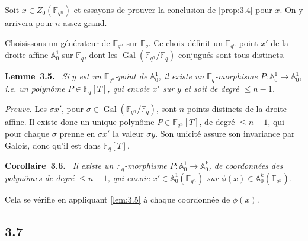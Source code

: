 \documentclass[11pt,a4paper]{article}
\makeatletter
\theoremstyle{plain}
\theoremstyle{definition}
\newenvironment{manualblock}[4]{%
  \par\medskip\noindent\textbf{#1~#2#3.}\def\@currentlabel{#2}\label{#4}\itshape\ }{\par\normalfont\medskip}
\DeclareMathOperator{\Gal}{Gal}
\makeatother
\begin{document}
Soit $x \in Z_0(\mathbb{F}_{q^n})$ et essayons de prouver la conclusion de \ref{prop:3.4} pour $x$. On y arrivera pour $n$ assez grand.

Choisissons un g\'en\'erateur de $\mathbb{F}_{q^n}$ sur $\mathbb{F}_q$. Ce choix d\'efinit un $\mathbb{F}_{q^n}$-point $x'$ de la droite affine $\mathbb{A}_0^1$ sur $\mathbb{F}_q$, dont les $\Gal(\mathbb{F}_{q^n}/\mathbb{F}_q)$-conjugu\'es sont tous distincts.

\begin{manualblock}{Lemme}{3.5}{}{lem:3.5}
Si $y$ est un $\mathbb{F}_{q^n}$-point de $\mathbb{A}_0^1$, il existe un $\mathbb{F}_q$-morphisme $P: \mathbb{A}_0^1 \to \mathbb{A}_0^1$, i.e. un polyn\^ome $P \in \mathbb{F}_q[T]$, qui envoie $x'$ sur $y$ et soit de degr\'e $\leq n-1$.
\end{manualblock}

\noindent\textit{Preuve.} Les $\sigma x'$, pour $\sigma \in \Gal(\mathbb{F}_{q^n}/\mathbb{F}_q)$, sont $n$ points distincts de la droite affine. Il existe donc un unique polyn\^ome $P \in \mathbb{F}_{q^n}[T]$, de degr\'e $\leq n-1$, qui pour chaque $\sigma$ prenne en $\sigma x'$ la valeur $\sigma y$. Son unicit\'e assure son invariance par Galois, donc qu'il est dans $\mathbb{F}_q[T]$.

\begin{manualblock}{Corollaire}{3.6}{}{cor:3.6}
Il existe un $\mathbb{F}_q$-morphisme $P: \mathbb{A}_0^1 \to \mathbb{A}_0^k$, de coordonn\'ees des polyn\^omes de degr\'e $\leq n-1$, qui envoie $x' \in \mathbb{A}_0^1(\mathbb{F}_{q^n})$ sur $\phi(x) \in \mathbb{A}_0^k(\mathbb{F}_{q^n})$.
\end{manualblock}

Cela se v\'erifie en appliquant \ref{lem:3.5} \`a chaque coordonn\'ee de $\phi(x)$.

\subsection*{3.7}
\end{document}
